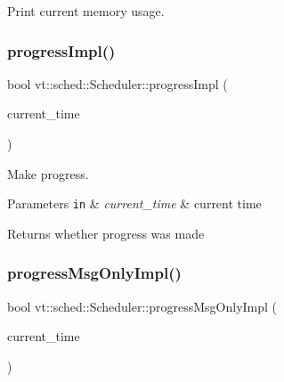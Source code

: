 Print current memory usage. 

\mbox{\label{structvt_1_1sched_1_1_scheduler_a29bba6f371736bcfaf542c7d6f46ad30}} 
\subsubsection{\texorpdfstring{progress\+Impl()}{progressImpl()}}
{\footnotesize\ttfamily bool vt\+::sched\+::\+Scheduler\+::progress\+Impl (\begin{DoxyParamCaption}\item[{\hyperlink{namespacevt_a876a9d0cd5a952859c72de8a46881442}{Time\+Type}}]{current\+\_\+time }\end{DoxyParamCaption})\hspace{0.3cm}{\ttfamily [private]}}



Make progress. 


\begin{DoxyParams}[1]{Parameters}
\mbox{\tt in}  & {\em current\+\_\+time} & current time\\
\hline
\end{DoxyParams}
\begin{DoxyReturn}{Returns}
whether progress was made 
\end{DoxyReturn}
\mbox{\label{structvt_1_1sched_1_1_scheduler_a24bc155e1e860c1c7723373128dfd90c}} 
\subsubsection{\texorpdfstring{progress\+Msg\+Only\+Impl()}{progressMsgOnlyImpl()}}
{\footnotesize\ttfamily bool vt\+::sched\+::\+Scheduler\+::progress\+Msg\+Only\+Impl (\begin{DoxyParamCaption}\item[{\hyperlink{namespacevt_a876a9d0cd5a952859c72de8a46881442}{Time\+Type}}]{current\+\_\+time }\end{DoxyParamCaption})\hspace{0.3cm}{\ttfamily [private]}}



